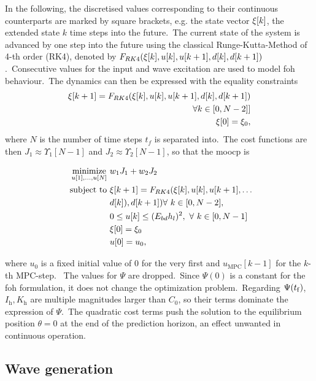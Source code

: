 In the following, the discretised values corresponding to their continuous counterparts are marked by square brackets, e.g. the state vector $\xi[k]$, the extended state $k$ time steps into the future.\ 
The current state of the system is advanced by one step into the future using the classical Runge-Kutta-Method of 4-th order (RK4), denoted by $F_{RK4}(\xi[k], u[k], u[k+1], d[k], d[k+1])$.\ 
Consecutive values for the input and wave excitation are used to model \ac{foh} behaviour.\ 
The dynamics can then be expressed with the equality constraints
\begin{align*}
	\xi[k+1] = F_{RK4}(\xi[k], u[k], u[k+1], d[k], d[k+1]) \\
	\forall k\in\left[0,N-2]\right]\\
	\xi[0] = \xi_0,
\end{align*}
where $N$ is the number of time steps $t_f$ is separated into.\ 
The cost functions are then $J_1 \approx \Upsilon_1[N-1]$ and $J_2 \approx \Upsilon_2[N-1]$, so that the \ac{moocp} is
\begin{problem}\label{pb:problem_disc}
	\begin{align}\label{eq:problem2}
		\operatorname*{minimize}_{u[1],\ldots,u[N]} \ &w_1 J_1 + w_2 J_2 \nonumber\\
		\ \text{subject to} \ & \xi[k+1] = F_{RK4}(\xi[k], u[k], u[k+1],\dots\nonumber\\ &d[k]), d[k+1])  \forall \ k \in [0, N-2], \nonumber\\
		&0 \le  u[k] \le (E_{bd} h_l)^2, \ \forall \ k \in [0, N-1]\\
		& \xi[0] = \xi_0\\
		& u[0] = u_0,
	\end{align}
\end{problem}
where $u_0$ is a fixed initial value of 0 for the very first and $u_\mathrm{MPC}[k-1]$ for the $k$-th MPC-step. \
The values for $\Psi$ are dropped.\ 
Since $\Psi(0)$ is a constant for the \ac{foh} formulation, it does not change the optimization problem.\ 
Regarding $\Psi(t_\mathrm{f})$, $I_\mathrm{h}, K_\mathrm{h}$ are multiple magnitudes larger than $C_0$, so their terms dominate the expression of $\Psi$.\ 
The quadratic cost terms push the solution to the equilibrium position $\theta = 0$ at the end of the prediction horizon, an effect unwanted in continuous operation.

\subsection{Wave generation}


